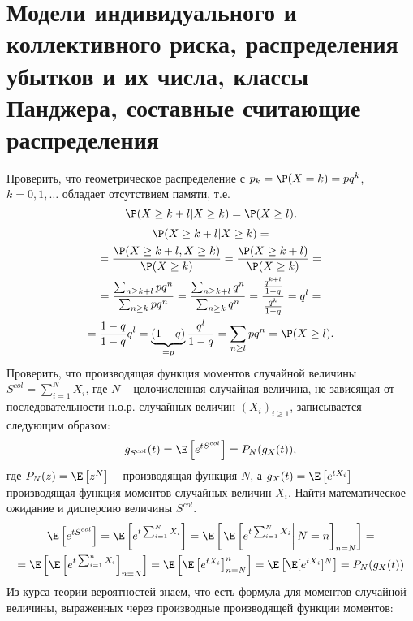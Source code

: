 \chapter{Модели индивидуального и коллективного риска, распределения убытков и их числа, классы Панджера, составные считающие распределения}
    \problem{}
        Проверить, что геометрическое распределение с $p_k = \P(X=k) = pq^k$, $k = 0, 1, \dots$ 
        обладает отсутствием памяти, т.е. 
        \begin{equation*}
            \P(X \geq k+l \vert X \geq k) = \P(X \geq l).
        \end{equation*}
    \solution{}
        \begin{multline*}
            \P(X \geq k+l \vert X \geq k) =\\= \frac{\P(X \geq k+l, X \geq k)}{\P(X \geq k)} = \frac{\P(X \geq k+l)}{\P(X \geq k)} = \\ =
            \frac{\sum _{n\geq k+l}pq^{n}}{\sum _{n\geq k}pq^{n}} = \frac{\sum _{n\geq k+l}q^{n}}{\sum _{n\geq k}q^{n}} = 
            \frac{\frac{q^{k+l}}{1-q}}{\frac{q^{k}}{1-q}} = q^l =\\= \frac{1-q}{1-q}q^l = \underbrace{(1-q)}_{=p} \frac{q^l}{1-q} = \sum_{n\geq l} pq^n = \P(X\geq l).
        \end{multline*}
    \problem{}
        Проверить, что производящая функция моментов случайной величины $S^{col} = \sum_{i=1}^{N} X_i$, где $N$ -- целочисленная случайная величина, не зависящая от последовательности н.о.р. случайных величин $(X_i)_{i \geq 1}$, записывается следующим образом:
        \begin{equation*}
            g_{S^{col}}(t) = \E \left[e^{tS^{col}}\right] = P_N(g_X(t)),
        \end{equation*}
        где $P_N(z) = \E \left[z^N\right]$ -- производящая функция $N$, а $g_X(t) = \E \left[e^{tX_i}\right]$ -- производящая функция моментов случайных величин $X_i$. Найти математическое ожидание и дисперсию величины $S^{col}$.
    \solution{}
        \begin{multline*}
            \E \left[e^{tS^{col}}\right] = \E \left[e^{t\sum_{i=1}^{N} X_i}\right] = \E \left[\left.\E\left[ e^{t\sum_{i=1}^{N} X_i}\right| N=n\right]_{n=N}\right] = \\ =
            \E \left[\E\left[ e^{t\sum_{i=1}^{n} X_i}\right]_{n=N}\right] = \E \left[\E\left[ e^{tX_i}\right]^n_{n=N}\right] = 
            \E \left[ \E[e^{tX_i}]^N\right] = P_N(g_X(t))
        \end{multline*}
        Из курса теории вероятностей знаем, что есть формула для моментов случайной величины, выраженных через производные производящей функции моментов:
